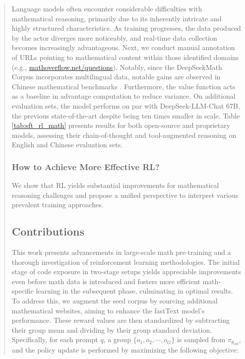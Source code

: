\begin{abstract}
Language models often encounter considerable difficulties with mathematical reasoning, primarily due to its inherently intricate and highly structured characteristics. As training progresses, the data produced by the actor diverges more noticeably, and real-time data collection becomes increasingly advantageous. Next, we conduct manual annotation of URLs pointing to mathematical content within those identified domains (e.g., \url{mathoverflow.net/questions}). Notably, since the DeepSeekMath Corpus incorporates multilingual data, notable gains are observed in Chinese mathematical benchmarks \citep{wei2023cmath,agieval}. Furthermore, the value function acts as a baseline in advantage computation to reduce variance. On additional evaluation sets, the model performs on par with DeepSeek-LLM-Chat 67B, the previous state-of-the-art despite being ten times smaller in scale. Table \ref{tab:sft_rl_math} presents results for both open-source and proprietary models, assessing their chain-of-thought and tool-augmented reasoning on English and Chinese evaluation sets. \subsubsection{How to Achieve More Effective RL?}
\label{sec:effec_rl}
We show that RL yields substantial improvements for mathematical reasoning challenges and propose a unified perspective to interpret various prevalent training approaches. \subsection{Contributions}
This work presents advancements in large-scale math pre-training and a thorough investigation of reinforcement learning methodologies. The initial stage of code exposure in two-stage setups yields appreciable improvements even before math data is introduced and fosters more efficient math-specific learning in the subsequent phase, culminating in optimal results. To address this, we augment the seed corpus by sourcing additional mathematical websites, aiming to enhance the fastText model's performance. These reward values are then standardized by subtracting their group mean and dividing by their group standard deviation. Specifically, for each prompt $q$, a group $\{o_1, o_2, \cdots, o_G\}$ is sampled from $\pi_{\theta_{old}}$, and the policy update is performed by maximizing the following objective:


\end{abstract}
